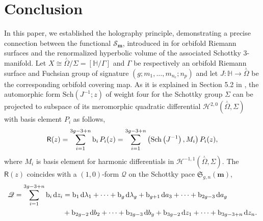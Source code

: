 \documentclass[a4paper,11pt]{article}
\newcommand{\dd}{\mathrm{d}}
\newcommand{\UHP}{\mathbb{H}}
\newcommand{\Hilbert}{\mathcal{H}}
\newcommand{\schottky}{\mathfrak{S}}
\newcommand{\Gpotential}{\mathscr{S}}
\newcommand{\singrigon}{\overset{{}_{\curlywedge}}{\Omega}}
\begin{document}
\section{Conclusion}
In this paper, we established the holography principle, demonstrating a precise connection between the functional $\Gpotential_{\boldsymbol{m}}$, introduced in \cite{Taghavi2024classical} for orbifold Riemann surfaces and the renormalized hyperbolic volume of the associated Schottky 3-manifold.  Let $X \cong \singrigon \slash \Sigma = [\UHP \slash \Gamma]$ and $\Gamma$ be respectively an orbifold Riemann surface and Fuchsian group of signature  $(g;m_1,\dots,m_{n_e};n_p)$ and let $J : \UHP \to \singrigon$ be the corresponding orbifold covering map. As it is explained in Section 5.2  in \cite{Taghavi2024classical}, the automorphic form $\text{Sch}\left(J^{-1};z\right)$ of weight four for the Schottky group $\Sigma$ can be projected to subspace of its meromorphic quadratic differential  $\Hilbert^{2,0}(\singrigon,\Sigma)$ with basis element $P_i$ as follows,
\begin{equation*}\label{Rquaddiffexpansion}
\mathsf{R}(z) = \sum_{i=1}^{3g-3+n} \mathrm{b}_i\hspace{.5mm} P_i(z) = \sum_{i=1}^{3g-3+n} \left( \text{Sch}\left(J^{-1}\right), M_i \right) P_i(z),
\end{equation*}
where $M_i$ is basis element for harmonic differentials in $\Hilbert^{-1,1}(\singrigon,\Sigma)$. The $\mathsf{R}(z)$ coincides with a $(1,0)$-form $\mathscr{Q}$ on the Schottky pace $\schottky_{g,n}(\boldsymbol{m})$,\hspace{1mm}
\begin{equation*}\label{D}
\begin{split}
\mathscr{Q}= \sum_{i=1}^{3g-3+n}\mathrm{b}_i \hspace{.5mm}\dd z_i & = \mathrm{b}_1\hspace{.5mm}\dd\lambda_1+\dots +\mathrm{b}_g \hspace{.5mm}\dd\lambda_g+\mathrm{b}_{g+1}\hspace{.5mm}\dd a_3+\dots+\mathrm{b}_{2g-3}\hspace{.5mm}\dd a_g\\
&+\mathrm{b}_{2g-2}\hspace{.5mm}\dd b_2+\dots+\mathrm{b}_{3g-3}\hspace{.5mm}\dd b_g+\mathrm{b}_{3g-2}\hspace{.5mm}\dd z_1+\dots+\mathrm{b}_{3g-3+n}\hspace{.5mm}\dd z_n.
\end{split}
\end{equation*}
\end{document}
